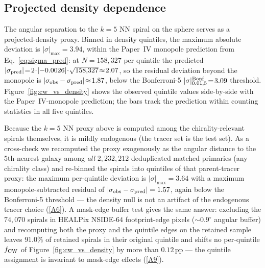 \documentclass[twocolumn,linenumbers]{aastex702}
\newcommand{\repoBase}{https://github.com/Hubify-Projects/bigbounce/blob/main}
\begin{document}
\subsection{Projected density dependence}\label{sec:results_density}

The angular separation to the $k\!=\!5$ NN spiral on the sphere serves
as a projected-density proxy. Binned in density quintiles, the maximum
absolute deviation is $|\sigma|_{\max}\!=\!3.94$,
within the Paper~IV monopole prediction from Eq.~\eqref{eq:sigma_pred}:
at $N\!=\!158{,}327$ per quintile the predicted
$|\sigma_{\rm pred}|\!=\!2\!\cdot\!|{-0.0026}|\!\cdot\!\sqrt{158{,}327}\!\approx\!2.07$,
so the residual deviation beyond the monopole is
$|\sigma_{\rm obs}-\sigma_{\rm pred}|\!\approx\!1.87$, below the
Bonferroni-5 $|\sigma|^{\rm Bonf}_{0.01,5}\!=\!3.09$ threshold.
Figure~\ref{fig:cw_vs_density} shows the observed quintile values
side-by-side with the Paper~IV-monopole prediction; the bars track the
prediction within counting statistics in all five quintiles.

Because the $k\!=\!5$ NN proxy above is computed among the
chirality-relevant spirals themselves, it is mildly endogenous (the
tracer set is the test set). As a cross-check we recomputed the proxy
exogenously as the angular distance to the 5th-nearest galaxy among
\emph{all} $2{,}232{,}212$ deduplicated matched primaries (any
chirality class) and re-binned the spirals into quintiles of that
parent-tracer proxy: the maximum per-quintile deviation is
$|\sigma|_{\max} = 3.64$ with a maximum monopole-subtracted residual
of $|\sigma_{\rm obs}-\sigma_{\rm pred}| = 1.57$, again below the
Bonferroni-5 threshold — the density null is not an artifact of the
endogenous tracer choice
(\href{\repoBase/pipelines/p5\_desi\_chirality/outputs/18\_v0151\_stratified\_and\_density.json}{[A6]}).
A mask-edge buffer test gives the same answer: excluding the
$74{,}070$ spirals in HEALPix NSIDE-$64$ footprint-edge pixels
(${\sim}0.9^\circ$ angular buffer) and recomputing both the proxy and
the quintile edges on the retained sample leaves $91.0\%$ of retained
spirals in their original quintile and shifts no per-quintile
$f_{\rm CW}$ of Figure~\ref{fig:cw_vs_density} by more than
$0.12$\,pp — the quintile assignment is invariant to mask-edge
effects
(\href{\repoBase/pipelines/p5\_desi\_chirality/outputs/22\_r24conf\_local\_batch.json}{[A9]}).
\end{document}

